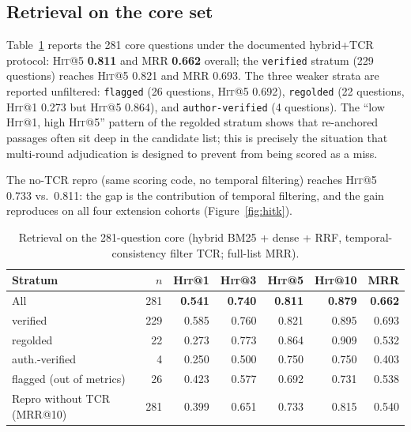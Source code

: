 \documentclass[10pt,a4paper,twocolumn]{article}
\newcommand{\hit}{\textsc{Hit}}
\newcommand{\code}[1]{\texttt{#1}}
\begin{document}
\subsection{Retrieval on the core set}

Table~\ref{tab:core-retrieval} reports the 281 core questions under the documented hybrid+TCR protocol: \hit{}@5 \textbf{0.811} and MRR \textbf{0.662} overall; the \code{verified} stratum (229 questions) reaches \hit{}@5 0.821 and MRR 0.693. The three weaker strata are reported unfiltered: \code{flagged} (26 questions, \hit{}@5 0.692), \code{regolded} (22 questions, \hit{}@1 0.273 but \hit{}@5 0.864), and \code{author-verified} (4 questions). The ``low \hit{}@1, high \hit{}@5'' pattern of the regolded stratum shows that re-anchored passages often sit deep in the candidate list; this is precisely the situation that multi-round adjudication is designed to prevent from being scored as a miss.

The no-TCR repro (same scoring code, no temporal filtering) reaches \hit{}@5 0.733 vs.\ 0.811: the gap is the contribution of temporal filtering, and the gain reproduces on all four extension cohorts (Figure~\ref{fig:hitk}).

\begin{table}[t]
\centering\scriptsize
\caption{Retrieval on the 281-question core (hybrid BM25 + dense + RRF, temporal-consistency filter TCR; full-list MRR).}
\label{tab:core-retrieval}
\setlength{\tabcolsep}{2.6pt}
\begin{tabular}{lrrrrrr}
\toprule
Stratum & $n$ & \hit{}@1 & \hit{}@3 & \hit{}@5 & \hit{}@10 & MRR \\
\midrule
All & 281 & \textbf{0.541} & \textbf{0.740} & \textbf{0.811} & \textbf{0.879} & \textbf{0.662} \\
\quad verified & 229 & 0.585 & 0.760 & 0.821 & 0.895 & 0.693 \\
\quad regolded & 22 & 0.273 & 0.773 & 0.864 & 0.909 & 0.532 \\
\quad auth.-verified & 4 & 0.250 & 0.500 & 0.750 & 0.750 & 0.403 \\
\quad flagged (out of metrics) & 26 & 0.423 & 0.577 & 0.692 & 0.731 & 0.538 \\
\midrule
Repro without TCR (MRR@10) & 281 & 0.399 & 0.651 & 0.733 & 0.815 & 0.540 \\
\bottomrule
\end{tabular}
\end{table}
\end{document}

